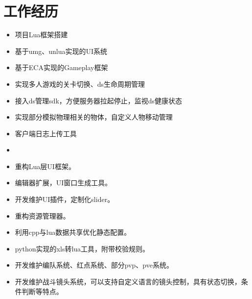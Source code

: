 \documentclass{resume}
\begin{document}
\section{工作经历}
\begin{itemize}
  \item 项目Lua框架搭建
  \item 基于umg、unlua实现的UI系统
  \item 基于ECA实现的Gameplay框架
  \item 实现多人游戏的关卡切换、ds生命周期管理
  \item 接入ds管理sdk，方便服务器拉起停止，监视ds健康状态
  \item 实现部分模拟物理相关的物体，自定义人物移动管理
  \item 客户端日志上传工具
  \item 
\end{itemize}
\begin{itemize}
  \item 重构Lua层UI框架。
  \item 编辑器扩展，UI窗口生成工具。
  \item 开发维护UI插件，定制化slider。
  \item 重构资源管理器。
  \item 利用cpp与lua数据共享优化静态配置。
  \item python实现的xls转lua工具，附带校验规则。
  \item 开发维护编队系统、红点系统、部分pvp、pve系统。
  \item 开发维护战斗镜头系统，可以支持自定义语言的镜头控制，具有状态切换，条件判断等特点。
\end{itemize}


%
%
\end{document}
